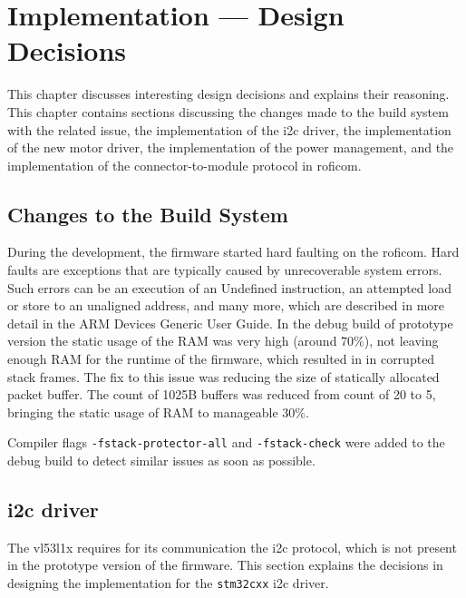 \documentclass[
  digital,     %
  oneside,     %
  nosansbold,  %
  nocolorbold, %
  nolof,         %
  nolot,         %
]{fithesis4}
\newcommand{\TODO}[1]{\textcolor{red}{\textit{#1}}}
\newcommand{\TODOLIST}[1]{}
\begin{document}
{{{\chapter{ Implementation --- Design Decisions } \label{ch:design}
This chapter discusses interesting design decisions and explains their reasoning. This chapter contains sections discussing the changes made to the build system with the related issue, the implementation of the \acrshort{i2c} driver, the implementation of the new motor driver, the implementation of the power management, and the implementation of the connector-to-module protocol in \acrshort{roficom}.

\section{ Changes to the Build System }
\TODOLIST{
\begin{itemize}
    \item static buffer vs ram
    \item Hard fault = ram had too high static usage, minimizing the usage by lower the number of available buckets for packets solved this (memory::pool)
\end{itemize}
}

During the development, the firmware started hard faulting on the \acrshort{roficom}. Hard faults are exceptions that are typically caused by unrecoverable system errors. Such errors can be an execution of an Undefined instruction, an attempted load or store to an unaligned address, and many more, which are described in more detail in the ARM Devices Generic User Guide. In the debug build of prototype version the static usage of the RAM was very high (around $70\%$), not leaving enough RAM for the runtime of the firmware, which resulted in in corrupted stack frames. The fix to this issue was reducing the size of statically allocated packet buffer. The count of 1025B buffers was reduced from count of 20 to 5, bringing the static usage of RAM to manageable $30\%$.

Compiler flags \lstinline|-fstack-protector-all| and \lstinline|-fstack-check| were added to the debug build to detect similar issues as soon as possible.

\section[ I2C driver ]{ \acrshort{i2c} driver }

The \gls{vl53l1x} requires for its communication the \acrshort{i2c} protocol, which is not present in the prototype version of the firmware. This section explains the decisions in designing the implementation for the \lstinline|stm32cxx| \acrshort{i2c} driver. 

}}}
\end{document}

